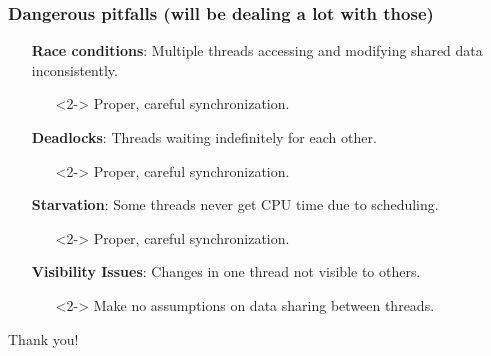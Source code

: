 \documentclass[xcolor={dvipsnames,svgnames},aspectratio=169]{beamer}
\begin{document}
\begin{frame}[fragile]
  \frametitle{Dangerous pitfalls (will be dealing a lot with those)}

  \begin{itemize}
  \item[\faUserInjured] \textbf{Race conditions}: Multiple threads accessing and
    modifying shared data inconsistently.
    \begin{itemize}
    \item[\faBriefcaseMedical]<2-> Proper, careful synchronization.
    \end{itemize}
  \item[\faUserInjured] \textbf{Deadlocks}: Threads waiting indefinitely for each
    other.
    \begin{itemize}
    \item[\faBriefcaseMedical]<2-> Proper, careful synchronization.
    \end{itemize}
  \item[\faUserInjured] \textbf{Starvation}: Some threads never get CPU time due to
    scheduling.
    \begin{itemize}
    \item[\faBriefcaseMedical]<2-> Proper, careful synchronization.
    \end{itemize}
  \item[\faUserInjured] \textbf{Visibility Issues}: Changes in one thread
    not visible to others.
    \begin{itemize}
    \item[\faBriefcaseMedical]<2-> Make no assumptions on data sharing between threads.
    \end{itemize}
  \end{itemize}
\end{frame}


\begin{frame}{}
  \centering \huge
  Thank you!
\end{frame}

\end{document}
